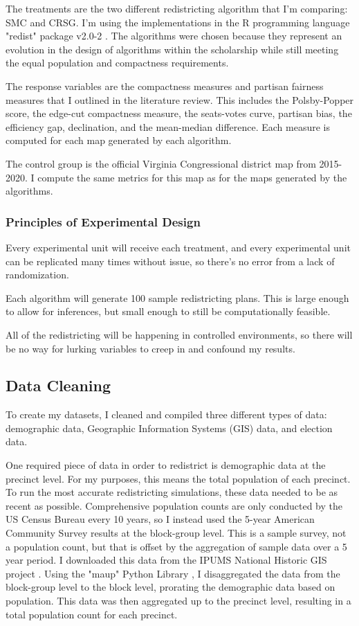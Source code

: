 The treatments  are the two different redistricting algorithm that I'm comparing: SMC and CRSG. I'm using the implementations in the R programming language "redist" package v2.0-2 \parencite{fifield2020d}. The algorithms were chosen because they represent an evolution in the design of algorithms within the scholarship while still meeting the equal population and compactness requirements.

The response variables are the compactness measures and partisan fairness measures that I outlined in the literature review. This includes the Polsby-Popper score, the edge-cut compactness measure, the seats-votes curve, partisan bias, the efficiency gap, declination, and the mean-median difference. Each measure is computed for each map generated by each algorithm.

The control group is the official Virginia Congressional district map from 2015-2020. I compute the same metrics for this map as for the maps generated by the algorithms.

\subsubsection{Principles of Experimental Design}

Every experimental unit will receive each treatment, and every experimental unit can be replicated many times without issue, so there’s no error from a lack of randomization. 

Each algorithm will generate 100 sample redistricting plans. This is large enough to allow for inferences, but small enough to still be computationally feasible. 

All of the redistricting will be happening in controlled environments, so there will be no way for lurking variables to creep in and confound my results. 

\subsection{Data Cleaning}

To create my datasets, I cleaned and compiled three different types of data: demographic data, Geographic Information Systems (GIS) data, and election data.

One required piece of data in order to redistrict is demographic data at the precinct level. For my purposes, this means the total population of each precinct. To run the most accurate redistricting simulations, these data needed to be as recent as possible. Comprehensive population counts are only conducted by the US Census Bureau every 10 years, so I instead used the 5-year American Community Survey results at the block-group level. This is a sample survey, not a population count, but that is offset by the aggregation of sample data over a 5 year period. I downloaded this data from the IPUMS National Historic GIS project \parencite{mansonsteven2020}. Using the "maup" Python Library \parencite{hully}, I disaggregated the data from the block-group level to the block level, prorating the demographic data based on population. This data was then aggregated up to the precinct level, resulting in a total population count for each precinct.

